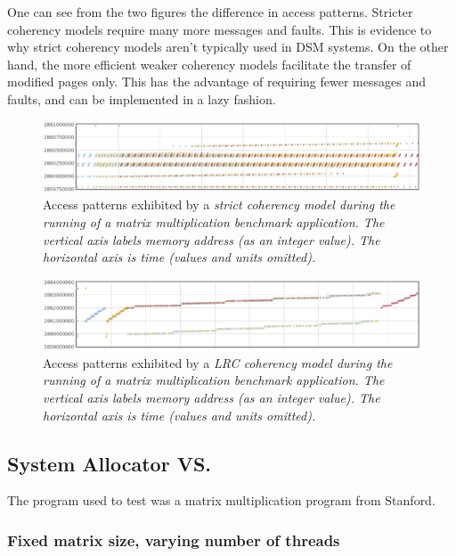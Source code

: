 One can see from the two figures the difference in access patterns.  Stricter coherency models require many more messages and faults.  This is evidence to why strict coherency models aren't typically used in DSM systems.  On the other hand, the more efficient weaker coherency models facilitate the transfer of modified pages only.  This has the advantage of requiring fewer messages and faults, and can be implemented in a lazy fashion.

\begin{figure}[t]
\centering
\includegraphics[scale=0.40]{images/access-patterns-strict.eps}
\caption{Access patterns exhibited by a \em strict \em coherency model during the running of a matrix multiplication benchmark application.  The vertical axis labels memory address (as an integer value).  The horizontal axis is time (values and units omitted).}
\label{access-patters-strict}
\end{figure}

\begin{figure}[t]
\centering
\includegraphics[scale=0.40]{images/access-patterns-rc.eps}
\caption{Access patterns exhibited by a \em LRC \em coherency model during the running of a matrix multiplication benchmark application.  The vertical axis labels memory address (as an integer value).  The horizontal axis is time (values and units omitted).}
\label{access-patters-rc}
\end{figure}



\subsection{System Allocator VS. \projname{}}

The program used to test was a matrix multiplication program from Stanford.

\subsubsection{Fixed matrix size, varying number of threads}

